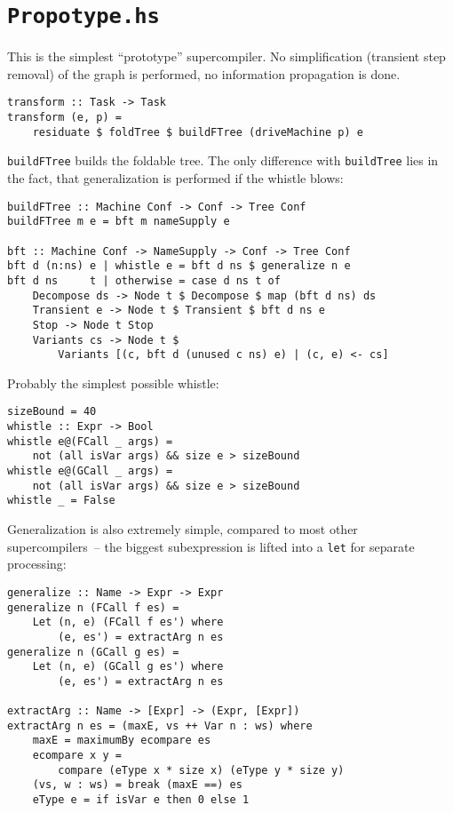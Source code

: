 \section{\texttt{Propotype.hs}}

This is the simplest ``prototype'' supercompiler.
No simplification (transient step removal) of the graph is performed, no information propagation is done.
\begin{lstlisting}[name=prototype]
transform :: Task -> Task
transform (e, p) =
	residuate $ foldTree $ buildFTree (driveMachine p) e
\end{lstlisting}

\texttt{buildFTree} builds the foldable tree. 
The only difference with \texttt{buildTree} lies in the fact,
that generalization is performed if the whistle blows:
\begin{lstlisting}[name=prototype]
buildFTree :: Machine Conf -> Conf -> Tree Conf
buildFTree m e = bft m nameSupply e

bft :: Machine Conf -> NameSupply -> Conf -> Tree Conf
bft d (n:ns) e | whistle e = bft d ns $ generalize n e
bft d ns     t | otherwise = case d ns t of
	Decompose ds -> Node t $ Decompose $ map (bft d ns) ds
	Transient e -> Node t $ Transient $ bft d ns e
	Stop -> Node t Stop
	Variants cs -> Node t $ 
		Variants [(c, bft d (unused c ns) e) | (c, e) <- cs]
\end{lstlisting}

Probably the simplest possible whistle:
\begin{lstlisting}[name=prototype]
sizeBound = 40
whistle :: Expr -> Bool
whistle e@(FCall _ args) = 
	not (all isVar args) && size e > sizeBound
whistle e@(GCall _ args) = 
	not (all isVar args) && size e > sizeBound
whistle _ = False
\end{lstlisting}

Generalization is also extremely simple, compared to most other supercompilers~--
the biggest subexpression is lifted into a \texttt{let} for separate processing:
\begin{lstlisting}[name=prototype]
generalize :: Name -> Expr -> Expr
generalize n (FCall f es) =
	Let (n, e) (FCall f es') where 
		(e, es') = extractArg n es
generalize n (GCall g es) =
	Let (n, e) (GCall g es') where 
		(e, es') = extractArg n es

extractArg :: Name -> [Expr] -> (Expr, [Expr])
extractArg n es = (maxE, vs ++ Var n : ws) where
	maxE = maximumBy ecompare es
	ecompare x y = 
		compare (eType x * size x) (eType y * size y)
	(vs, w : ws) = break (maxE ==) es
	eType e = if isVar e then 0 else 1
\end{lstlisting}
